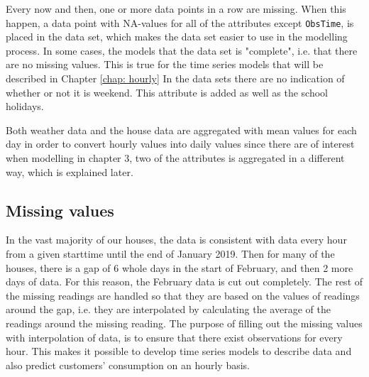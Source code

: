 \noindent Every now and then, one or more data points in a row are missing. When this happen, a data point with NA-values for all of the attributes except \texttt{ObsTime}, is placed in the data set, which makes the data set easier to use in the modelling process. In some cases, the models that the data set is "complete", i.e. that there are no missing values. This is true for the time series models that will be described in Chapter \ref{chap: hourly} In the data sets there are no indication of whether or not it is weekend. This attribute is added as well as the school holidays.

\noindent Both weather data and the house data are aggregated with mean values for each day in order to convert hourly values into daily values since there are of interest when modelling in chapter 3, two of the attributes is aggregated in a different way, which is explained later.


\subsection{Missing values}
In the vast majority of our houses, the data is consistent with data every hour from a given starttime until the end of January 2019. Then for many of the houses, there is a gap of 6 whole days in the start of February, and then 2 more days of data. For this reason, the February data is cut out completely. The rest of the missing readings are handled so that they are based on the values of readings around the gap, i.e. they are interpolated by calculating the average of the readings around the missing reading.
The purpose of filling out the missing values with interpolation of data, is to ensure that there exist observations for every hour. This makes it possible to develop time series models to describe data and also predict customers' consumption on an hourly basis.


